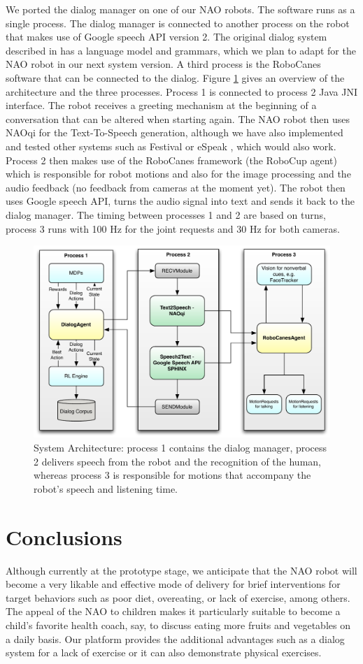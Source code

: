 \documentclass[letterpaper]{article}
\begin{document}
We ported the dialog manager on one of our NAO robots. The software runs as a single process. The
dialog manager is connected to another process on the robot that makes use of Google speech API 
version 2. The original dialog system described in \cite{YASCLL14} has a language model and 
grammars, which we plan to  adapt for the NAO robot in our next system version. A third process is 
the RoboCanes software that can be connected to the dialog. Figure \ref{fig:system} gives an 
overview of the architecture and the three processes. Process 1 is connected to process 2 Java JNI 
interface. The robot receives a greeting mechanism  at the beginning of a conversation that can be 
altered when starting again. The NAO robot then uses NAOqi for the Text-To-Speech generation, 
although we have also implemented and tested other systems such as Festival 
\cite{taylor1998architecture} or eSpeak \cite{eSpeak}, which would also work. Process 2 then makes 
use of the RoboCanes framework (the RoboCup agent) which is responsible for robot motions and also 
for the image processing and the audio feedback (no feedback from cameras at the moment yet). The 
robot then uses Google speech API, turns the audio signal into text and sends it back to the dialog 
manager. The timing between processes 1 and 2 are based on turns, process 3 runs with 100 Hz for the 
joint requests and 30 Hz for both cameras.

\begin{figure}[!t] 
\centering 
\includegraphics[width=.49\textwidth]{figures/system} 
\caption{System Architecture: process 1 contains the dialog manager, process 2 delivers speech from 
the robot and
the recognition of the human, whereas process 3 is responsible for motions that accompany the 
robot's
speech and listening time.} 
\label{fig:system} 
\end{figure}


\section*{Conclusions} 

Although currently at the prototype stage, we anticipate that the NAO robot will become a very 
likable and effective mode of delivery for brief interventions for target behaviors such as poor 
diet, overeating, or lack of exercise, among others.  The appeal of the NAO to children 
\cite{belpaeme2012multimodal} makes it particularly suitable to become a child's favorite health 
coach, say, to discuss eating more fruits and vegetables on a daily basis. Our platform 
provides the additional advantages such as a dialog system for a lack of exercise or  it can 
also demonstrate physical exercises.

       
   
\end{document}
